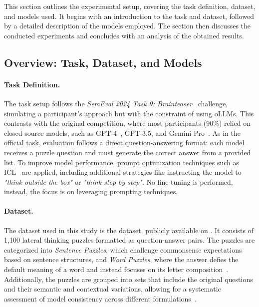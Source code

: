 This section outlines the experimental setup, covering the task definition, dataset, and models used. It begins with an introduction to the task and dataset, followed by a detailed description of the models employed. The section then discusses the conducted experiments and concludes with an analysis of the obtained results.

\subsection{Overview: Task, Dataset, and Models}

\paragraph{Task Definition.}
The task setup follows the \textit{SemEval 2024 Task 9: Brainteaser}~\cite{jiangBRAINTEASERLateralThinking2023} challenge, simulating a participant's approach but with the constraint of using \acp{oLLM}. This contrasts with the original competition, where most participants (90\%) relied on closed-source models, such as \acs{GPT}-4~\cite{openaiGPT4TechnicalReport2024}, \acs{GPT}-3.5, and Gemini Pro~\cite{teamGeminiFamilyHighly2024}. As in the official task, evaluation follows a direct question-answering format: each model receives a puzzle question and must generate the correct answer from a provided list. To improve model performance, prompt optimization techniques such as \ac{ICL}~\cite{brownLanguageModelsAre2020} are applied, including additional strategies like instructing the model to \textit{"think outside the box"} or \textit{"think step by step"}. No fine-tuning is performed, instead, the focus is on leveraging prompting techniques.

\paragraph{Dataset.}
The dataset used in this study is the  dataset, publicly available on . It consists of 1,100 lateral thinking puzzles formatted as question-answer pairs. The puzzles are categorized into \textit{Sentence Puzzles}, which challenge commonsense expectations based on sentence structures, and \textit{Word Puzzles}, where the answer defies the default meaning of a word and instead focuses on its letter composition~\cite{jiangBRAINTEASERLateralThinking2023}. Additionally, the puzzles are grouped into sets that include the original questions and their semantic and contextual variations, allowing for a systematic assessment of model consistency across different formulations~\cite{jiangBRAINTEASERLateralThinking2023}.

